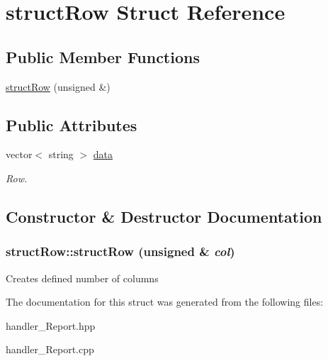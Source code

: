 \hypertarget{structstructRow}{
\section{structRow Struct Reference}
\label{structstructRow}
}
\subsection*{Public Member Functions}
\begin{DoxyCompactItemize}
\item 
\hyperlink{structstructRow_a09213fb7bb170a682869db469718761e}{structRow} (unsigned \&)
\end{DoxyCompactItemize}
\subsection*{Public Attributes}
\begin{DoxyCompactItemize}
\item 
\hypertarget{structstructRow_a627f7dc245b2dd29b2c94e02f5347573}{
vector$<$ string $>$ \hyperlink{structstructRow_a627f7dc245b2dd29b2c94e02f5347573}{data}}
\label{structstructRow_a627f7dc245b2dd29b2c94e02f5347573}

\begin{DoxyCompactList}\small\item\em Row. \item\end{DoxyCompactList}\end{DoxyCompactItemize}


\subsection{Constructor \& Destructor Documentation}
\hypertarget{structstructRow_a09213fb7bb170a682869db469718761e}{
\subsubsection[{structRow}]{\setlength{\rightskip}{0pt plus 5cm}structRow::structRow (unsigned \& {\em col})}}
\label{structstructRow_a09213fb7bb170a682869db469718761e}


Creates defined number of columns 



The documentation for this struct was generated from the following files:\begin{DoxyCompactItemize}
\item 
handler\_\-Report.hpp\item 
handler\_\-Report.cpp\end{DoxyCompactItemize}

